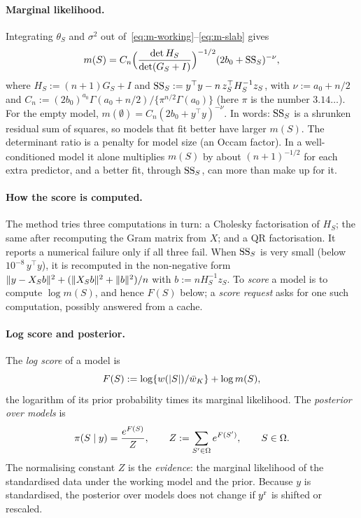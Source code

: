 \documentclass[11pt]{article}
\begin{document}
\paragraph{Marginal likelihood.} Integrating $\theta_S$ and $\sigma^2$ out of~\eqref{eq:m-working}--\eqref{eq:m-slab}
gives
\begin{equation}\label{eq:m-marglik}
  m(S)=C_n\Big(\frac{\det H_S}{\det(G_S+I)}\Big)^{-1/2}(2b_0+\mathrm{SS}_S)^{-\nu},
\end{equation}
where $H_S:=(n+1)G_S+I$ and $\mathrm{SS}_S:=y^\top y-n\,z_S^\top H_S^{-1}z_S$,
with $\nu:=a_0+n/2$ and $C_n:=(2b_0)^{a_0}\Gamma(a_0+n/2)/\{\pi^{n/2}\Gamma(a_0)\}$ (here $\pi$ is the number $3.14\ldots$).
For the empty model, $m(\emptyset)=C_n(2b_0+y^\top y)^{-\nu}$. In words: $\mathrm{SS}_S$ is a shrunken residual sum of squares,
so models that fit better have larger $m(S)$. The determinant ratio is a penalty for model size (an Occam factor). In a
well-conditioned model it alone multiplies $m(S)$ by about $(n+1)^{-1/2}$ for each extra predictor, and a better fit,
through $\mathrm{SS}_S$, can more than make up for it.

\paragraph{How the score is computed.} The method tries three computations in turn: a Cholesky factorisation of $H_S$;
the same after recomputing the Gram matrix from $X$; and a QR factorisation. It reports a numerical failure only if all
three fail. When $\mathrm{SS}_S$ is very small (below $10^{-8}\,y^\top y$), it is recomputed in the non-negative form
$\lVert y-X_Sb\rVert^2+(\lVert X_Sb\rVert^2+\lVert b\rVert^2)/n$ with $b:=nH_S^{-1}z_S$. To \emph{score} a model is to compute $\log m(S)$,
and hence $F(S)$ below; a \emph{score request} asks for one such computation, possibly answered from a cache.

\paragraph{Log score and posterior.} The \emph{log score} of a model is
\begin{equation}\label{eq:m-score}
  F(S):=\log\{w(\lvert S\rvert)/\bar w_K\}+\log m(S),
\end{equation}
the logarithm of its prior probability times its marginal likelihood. The \emph{posterior over models} is
\begin{equation}\label{eq:m-posterior}
  \pi(S\mid y)=\frac{e^{F(S)}}{Z},\qquad Z:=\sum_{S'\in\Omega}e^{F(S')},\qquad S\in\Omega .
\end{equation}
The normalising constant $Z$ is the \emph{evidence}: the marginal likelihood of the standardised data under the working
model and the prior. Because $y$ is standardised, the posterior over models does not change if $y^{\mathrm r}$ is shifted or
rescaled.
\end{document}
